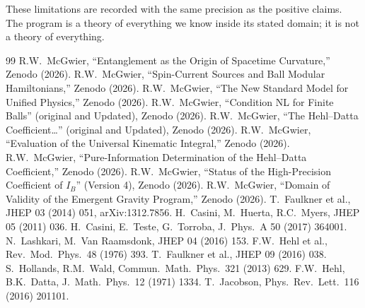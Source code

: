 \documentclass[11pt]{article}
\begin{document}
These limitations are recorded with the same precision as the positive
claims. The program is a theory of everything we know inside its stated
domain; it is not a theory of everything.

\begin{thebibliography}{99}
 R.W.\ McGwier, ``Entanglement as the Origin of Spacetime Curvature,'' Zenodo (2026).
 R.W.\ McGwier, ``Spin-Current Sources and Ball Modular Hamiltonians,'' Zenodo (2026).
 R.W.\ McGwier, ``The New Standard Model for Unified Physics,'' Zenodo (2026).
 R.W.\ McGwier, ``Condition NL for Finite Balls'' (original and Updated), Zenodo (2026).
 R.W.\ McGwier, ``The Hehl--Datta Coefficient\ldots'' (original and Updated), Zenodo (2026).
 R.W.\ McGwier, ``Evaluation of the Universal Kinematic Integral,'' Zenodo (2026).
 R.W.\ McGwier, ``Pure-Information Determination of the Hehl--Datta Coefficient,'' Zenodo (2026).
 R.W.\ McGwier, ``Status of the High-Precision Coefficient of $I_B$'' (Version 4), Zenodo (2026).
 R.W.\ McGwier, ``Domain of Validity of the Emergent Gravity Program,'' Zenodo (2026).
 T.\ Faulkner et al., JHEP 03 (2014) 051, arXiv:1312.7856.
 H.\ Casini, M.\ Huerta, R.C.\ Myers, JHEP 05 (2011) 036.
 H.\ Casini, E.\ Teste, G.\ Torroba, J.\ Phys.\ A 50 (2017) 364001.
 N.\ Lashkari, M.\ Van Raamsdonk, JHEP 04 (2016) 153.
 F.W.\ Hehl et al., Rev.\ Mod.\ Phys.\ 48 (1976) 393.
 T.\ Faulkner et al., JHEP 09 (2016) 038.
 S.\ Hollands, R.M.\ Wald, Commun.\ Math.\ Phys.\ 321 (2013) 629.
 F.W.\ Hehl, B.K.\ Datta, J.\ Math.\ Phys.\ 12 (1971) 1334.
 T.\ Jacobson, Phys.\ Rev.\ Lett.\ 116 (2016) 201101.
\end{thebibliography}
\end{document}
